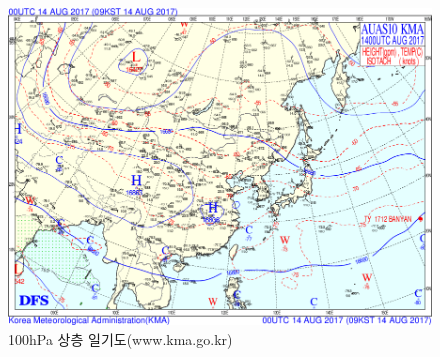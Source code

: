 \begin{figure}[h]\center
	\includegraphics[width=0.97\linewidth]{22Weather_forecasting/images/up10_2017081400}
	\caption{100hPa 상층 일기도(www.kma.go.kr)}
	\label{fig:draw-weathermapsurf10}
\end{figure}


	




